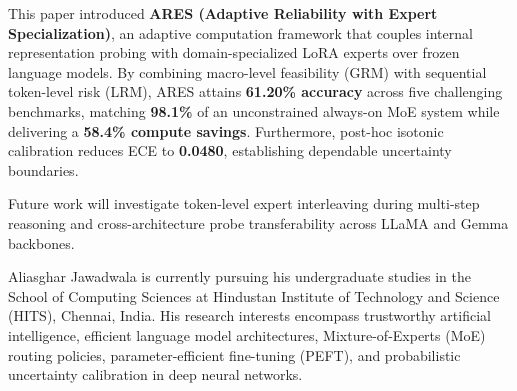 \documentclass[journal,10pt,twocolumn]{IEEEtran}
\begin{document}
This paper introduced \textbf{ARES (Adaptive Reliability with Expert Specialization)}, an adaptive computation framework that couples internal representation probing with domain-specialized LoRA experts over frozen language models. By combining macro-level feasibility (GRM) with sequential token-level risk (LRM), ARES attains \textbf{61.20\% accuracy} across five challenging benchmarks, matching \textbf{98.1\%} of an unconstrained always-on MoE system while delivering a \textbf{58.4\% compute savings}. Furthermore, post-hoc isotonic calibration reduces ECE to \textbf{0.0480}, establishing dependable uncertainty boundaries.

Future work will investigate token-level expert interleaving during multi-step reasoning and cross-architecture probe transferability across LLaMA and Gemma backbones.




\begin{IEEEbiographynophoto}{Aliasghar Jawadwala}
is currently pursuing his undergraduate studies in the School of Computing Sciences at Hindustan Institute of Technology and Science (HITS), Chennai, India. His research interests encompass trustworthy artificial intelligence, efficient language model architectures, Mixture-of-Experts (MoE) routing policies, parameter-efficient fine-tuning (PEFT), and probabilistic uncertainty calibration in deep neural networks.
\end{IEEEbiographynophoto}
\end{document}
